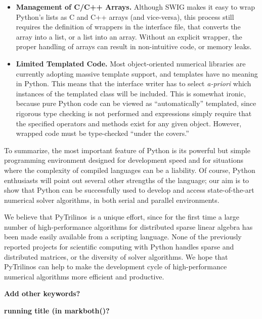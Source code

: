 \documentclass[acmtocl]{acmtrans2m}
\newcommand{\PyTrilinos}{{PyTrilinos}}
\begin{document}
\begin{itemize}
  {\bf Last sentence is difficult to read}

\item {\bf Management of C/C++ Arrays.} Although SWIG makes it easy to
  wrap Python's lists as C and C++ arrays (and vice-versa), this
  process still requires the definition of wrappers in the interface
  file, that converts the array into a list, or a list into an
  array. Without an explicit wrapper, the proper handling of arrays
  can result in non-intuitive code, or memory leaks.

\item {\bf Limited Templated Code.} Most object-oriented numerical
  libraries are currently adopting massive template support, and
  templates have no meaning in Python.  This means that the interface
  writer has to select {\sl a-priori} which instances of the templated
  class will be included.  This is somewhat ironic, because pure
  Python code can be viewed as ``automatically'' templated, since
  rigorous type checking is not performed and expressions simply
  require that the specified operators and methods exist for any given
  object.  However, wrapped code must be type-checked ``under the
  covers.''

\end{itemize}

\smallskip

To summarize, the most important feature of Python is its powerful but
simple programming environment designed for development speed and for
situations where the complexity of compiled languages can be a
liability. Of course, Python enthusiasts will point out several other
strengths of the language; our aim is to show that Python can be
successfully used to develop and access state-of-the-art numerical
solver algorithms, in both serial and parallel environments.

We believe that \PyTrilinos\ is a unique effort, since for the first
time a large number of high-performance algorithms for distributed
sparse linear algebra has been made easily available from a scripting
language.  None of the previously reported projects for scientific
computing with Python handles sparse and distributed matrices, or the
diversity of solver algorithms. We hope that PyTrilinos can help to
make the development cycle of high-performance numerical algorithms
more efficient and productive.

\bigskip

{\bf Add other keywords?}

{\bf running title (in markboth()?}



\end{document}
